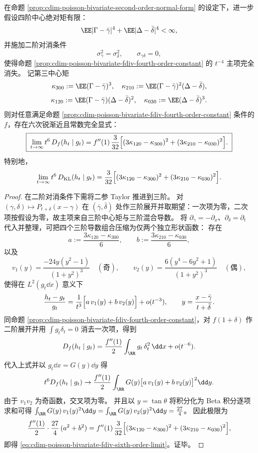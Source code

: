 \begin{proposition}\label{prop:cdim-poisson-bivariate-fdiv-sixth-order-constant}
在命题 \ref{prop:cdim-poisson-bivariate-second-order-normal-form} 的设定下，进一步假设四阶中心绝对矩有限：
\[
\EE|\Gamma-\bar\gamma|^4+\EE|\Delta-\bar\delta|^4<\infty,
\]
并施加二阶对消条件
\[
\sigma_\gamma^2=\sigma_\delta^2,\qquad \sigma_{\gamma\delta}=0,
\]
使得命题 \ref{prop:cdim-poisson-bivariate-fdiv-fourth-order-constant} 的 \(t^{-4}\) 主项完全消失。
记第三中心矩
\[
\kappa_{300}:=\EE(\Gamma-\bar\gamma)^3,\quad
\kappa_{210}:=\EE(\Gamma-\bar\gamma)^2(\Delta-\bar\delta),
\]
\[
\kappa_{120}:=\EE(\Gamma-\bar\gamma)(\Delta-\bar\delta)^2,\quad
\kappa_{030}:=\EE(\Delta-\bar\delta)^3.
\]
则对任意满足命题 \ref{prop:cdim-poisson-bivariate-fdiv-fourth-order-constant} 条件的 \(f\)，存在六次锐渐近且常数完全显式：
\begin{equation}\label{eq:cdim-poisson-bivariate-fdiv-sixth-order-limit}
\boxed{\;
\lim_{t\to\infty}t^6\,D_f(h_t\mid g_t)
=
f''(1)\,\frac{3}{32}\Bigl[(3\kappa_{120}-\kappa_{300})^2+(3\kappa_{210}-\kappa_{030})^2\Bigr].\;}
\end{equation}
特别地，
\[
\lim_{t\to\infty}t^6\,D_{\mathrm{KL}}(h_t\mid g_t)
=
\frac{3}{32}\Bigl[(3\kappa_{120}-\kappa_{300})^2+(3\kappa_{210}-\kappa_{030})^2\Bigr].
\]
\end{proposition}
\begin{proof}
在二阶对消条件下需将二参 Taylor 推进到三阶。
对 \((\gamma,\delta)\mapsto P_{t+\delta}(x-\gamma)\) 在 \((\bar\gamma,\bar\delta)\) 处作三阶展开并取期望：一次项为零，二次项按假设为零，故主项来自三阶中心矩与三阶混合导数。
将 \(\partial_\gamma=-\partial_x\)、\(\partial_\delta=\partial_t\) 代入并整理，可把四个三阶导数组合压缩为仅两个独立形状函数：
存在
\[
a:=\frac{3\kappa_{120}-\kappa_{300}}{6},\qquad
b:=\frac{3\kappa_{210}-\kappa_{030}}{6},
\]
以及
\[
v_1(y)=\frac{-24y(y^2-1)}{(1+y^2)^3}\quad(\text{奇}),\qquad
v_2(y)=\frac{6(y^4-6y^2+1)}{(1+y^2)^3}\quad(\text{偶}),
\]
使得在 \(L^2(g_t\dd x)\) 意义下
\[
\frac{h_t-g_t}{g_t}
=\frac{1}{t^3}\Bigl[a\,v_1(y)+b\,v_2(y)\Bigr]+o(t^{-3}),
\qquad y=\frac{x-\bar\gamma}{t+\bar\delta}.
\]
同命题 \ref{prop:cdim-poisson-bivariate-fdiv-fourth-order-constant}，对 \(f(1+\delta)\) 作二阶展开并用 \(\int g_t\delta_t=0\) 消去一次项，得到
\[
D_f(h_t\mid g_t)=\frac{f''(1)}{2}\int_{\RR} g_t\,\delta_t^2\,\dd x+o(t^{-6}).
\]
代入上式并以 \(g_t\dd x=G(y)\dd y\) 得
\[
t^6 D_f(h_t\mid g_t)\to
\frac{f''(1)}{2}\int_{\RR}G(y)\bigl[a\,v_1(y)+b\,v_2(y)\bigr]^2\dd y.
\]
由于 \(v_1v_2\) 为奇函数，交叉项为零。
并且以 \(y=\tan\theta\) 将积分化为 Beta 积分逐项求和可得
\(
\int_{\RR}G(y)\,v_1(y)^2\dd y=\int_{\RR}G(y)\,v_2(y)^2\dd y=\frac{27}{4}
\)。
因此极限为
\[
\frac{f''(1)}{2}\cdot\frac{27}{4}\,(a^2+b^2)
=f''(1)\,\frac{3}{32}\Bigl[(3\kappa_{120}-\kappa_{300})^2+(3\kappa_{210}-\kappa_{030})^2\Bigr],
\]
即得 \eqref{eq:cdim-poisson-bivariate-fdiv-sixth-order-limit}。证毕。
\end{proof}

